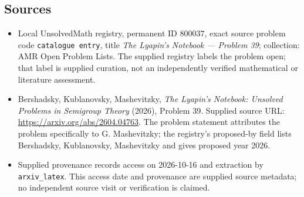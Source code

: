 \documentclass[11pt]{article}
\begin{document}
\subsection{Sources}
\begin{itemize}
\item Local UnsolvedMath registry, permanent ID \(800037\), exact source problem code \texttt{catalogue entry}, title \emph{The Lyapin's Notebook --- Problem 39}; collection: AMR Open Problem Lists. The supplied registry labels the problem open; that label is supplied curation, not an independently verified mathematical or literature assessment.
\item Bershadsky, Kublanovsky, Mashevitzky, \emph{The Lyapin's Notebook: Unsolved Problems in Semigroup Theory} (2026), Problem 39. Supplied source URL: \url{https://arxiv.org/abs/2604.04763}. The problem statement attributes the problem specifically to G. Mashevitzky; the registry's proposed-by field lists Bershadsky, Kublanovsky, Mashevitzky and gives proposed year 2026.
\item Supplied provenance records access on 2026-10-16 and extraction by \texttt{arxiv\_latex}. This access date and provenance are supplied source metadata; no independent source visit or verification is claimed.
\end{itemize}
\end{document}
